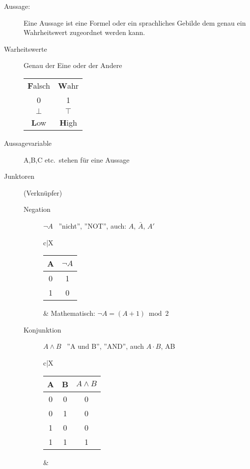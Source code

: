 \begin{description}
    \item[Aussage:] Eine Aussage ist eine Formel oder ein sprachliches Gebilde dem genau ein Wahrheitswert zugeordnet werden kann.

    \item[Warheitswerte] Genau der Eine oder der Andere \\
    \begin{tabular}{c|c}
        \textbf{F}alsch & \textbf{W}ahr \\
        0               & 1             \\
        $\bot$          & $\top$        \\
        \textbf{L}ow    & \textbf{H}igh
    \end{tabular}
    \item[Aussagevariable] A,B,C etc.\ stehen für eine Aussage
    \item[Junktoren] (Verknüpfer)
    \begin{description}
        \item[Negation] $\neg A$ \, ''nicht'', ''NOT'', auch: $A$, $\bar{A}$, $A'$ \\
        \begin{tabularx}{\linewidth}{c|X}
            \begin{tabular}[t]{c|c}
                A & $\neg A$ \\ \hline
                0 & 1        \\
                1 & 0
            \end{tabular} &
            Mathematisch: $\neg A = (A + 1) \bmod 2$ \\ \hline
        \end{tabularx}
        \item[Konjunktion] $A\wedge B$ \, ''A und B'', ''AND'', auch $A\cdot B$, AB \\
        \begin{tabularx}{\linewidth}{c|X}
            \begin{tabular}[t]{c|c||c}
                A & B & $A \wedge B$ \\ \hline\hline
                0 & 0 & 0            \\ \hline
                0 & 1 & 0            \\ \hline
                1 & 0 & 0            \\ \hline
                1 & 1 & 1
            \end{tabular} &
            \begin{tabular}[t]{ll}

\end{tabular}
\end{tabularx}
\end{description}
\end{description}
